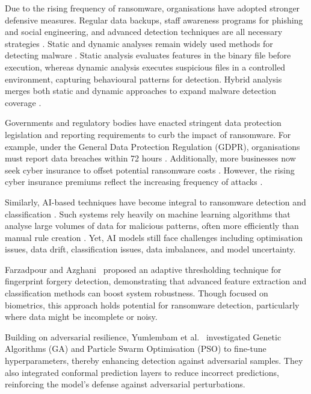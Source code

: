 Due to the rising frequency of ransomware, organisations have adopted stronger defensive measures. Regular data backups, staff awareness programs for phishing and social engineering, and  advanced detection techniques are all necessary strategies \cite{razaulla2023age}. Static and dynamic analyses remain widely used methods for detecting malware \cite{beaman2021ransomware}. 
Static analysis evaluates features in the binary file before execution, whereas dynamic analysis executes suspicious files in a controlled environment, capturing behavioural patterns for detection. Hybrid analysis merges both static and dynamic approaches to expand malware detection coverage \cite{kolosnjaji2016deep}.

Governments and regulatory bodies have enacted stringent data protection legislation and reporting requirements  to curb the impact of ransomware. For example, under the General Data Protection Regulation (GDPR), organisations must report data breaches within 72 hours \cite{europeancommission2020dataprotection}. 
Additionally,  more businesses now seek cyber insurance to offset potential ransomware costs \cite{mott2023between}. However, the rising cyber insurance premiums reflect the increasing frequency of attacks \cite{mott2023between}.

Similarly, AI-based techniques have become integral to ransomware detection and classification \cite{razaulla2023age, beaman2021ransomware}. Such systems rely heavily on machine learning algorithms that analyse large volumes of data for malicious  patterns, often more efficiently than manual rule creation \cite{fernando2020study, gibert2020rise, Ferdous2024Comp}. Yet, AI models still face challenges including optimisation issues, data drift, classification issues, data imbalances, and model uncertainty.

Farzadpour and Azghani~\cite{Farzadpour2024Thresholding} proposed an adaptive thresholding  technique for fingerprint forgery detection,  demonstrating that advanced feature extraction and classification methods can boost system robustness. Though focused on biometrics, this approach  holds potential for ransomware detection, particularly where data might be incomplete or noisy.

 Building on adversarial resilience, Yumlembam et al.~\cite{yumlembam2024comprehensive} investigated Genetic Algorithms (GA) and Particle Swarm Optimisation (PSO) to fine-tune hyperparameters, thereby enhancing detection against adversarial samples. They also integrated conformal prediction layers to reduce incorrect predictions, reinforcing the model’s defense against adversarial perturbations.


